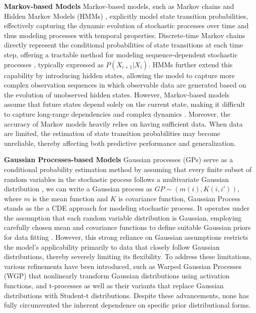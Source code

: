 \noindent \textbf{Markov-based Models}   Markov-based models, such as Markov chains 
 \cite{chung1967markov} and Hidden Markov Models (HMMs) \cite{eddy1996hidden}, explicitly model state transition probabilities, effectively capturing the dynamic evolution of stochastic processes over time and thus modeling processes with temporal properties. Discrete-time Markov chains \cite{gomez2010discrete} directly represent the conditional probabilities of state transitions at each time step, offering a tractable method for modeling sequence-dependent stochastic processes \cite{craig2002estimation}, typically expressed as $P(X_{i+1}|X_i)$. HMMs further extend this capability by introducing hidden states, allowing the model to capture more complex observation sequences in which observable data are generated based on the evolution of unobserved hidden states.
However, Markov-based models assume that future states depend solely on the current state, making it difficult to capture long-range dependencies and complex dynamics 
\cite{rabiner1989tutorial}. Moreover, the accuracy of Markov models heavily relies on having sufficient data. When data are limited, the estimation of state transition probabilities may become unreliable, thereby affecting both predictive performance and generalization.

\noindent \textbf{Gaussian Processes-based Models}   Gaussian processes (GPs) serve as a conditional probability estimation method by assuming that every finite subset of random variables in the stochastic process follows a multivariate Gaussian distribution 
 \cite{seeger2004gaussian}, we can write a Gaussian process as $GP \sim (m(i),K(i,i'))$, where $m$ is the mean function and $K$ is covariance function, 
Gaussian Process stands as the a CDE approach for modeling stochastic process. It operates under the assumption that each random variable distribution is Gaussian, employing carefully chosen mean and covariance functions to define suitable Gaussian priors for data fitting \cite{williams1995gaussian}. However, this strong reliance on Gaussian assumptions restricts the model’s applicability primarily to data that closely follow Gaussian distributions, thereby severely limiting its flexibility. To address these limitations, various refinements have been introduced, such as Warped Gaussian Processes (WGP) 
\cite{lazaro2012bayesian} that nonlinearly transform Gaussian distributions using activation functions, and t-processes \cite{shah2014student} as well as their variants \cite{jylanki2011robust} \cite{chen2020multivariate} that replace Gaussian distributions with Student-t distributions. Despite these advancements, none has fully circumvented the inherent dependence on specific prior distributional forms.

